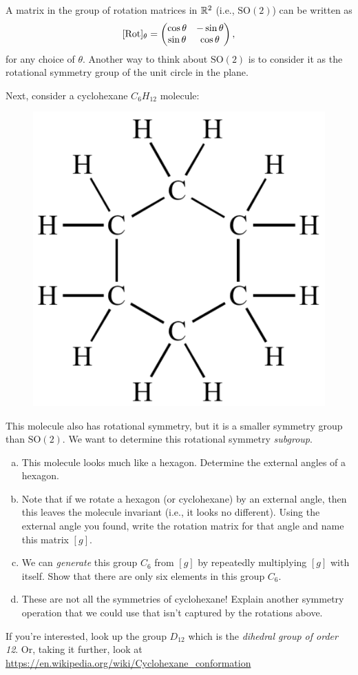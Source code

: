\documentclass[12pt]{article} %
\begin{document}
\newpage
\begin{problem}
A matrix in the group of rotation matrices in $\mathbb{R}^2$ (i.e., $\mathrm{SO}(2)$) can be written as
\[
[\mathrm{Rot}]_\theta = \begin{pmatrix} \cos \theta & - \sin \theta \\ \sin \theta & \cos \theta \end{pmatrix},
\]
for any choice of $\theta$. Another way to think about $\mathrm{SO}(2)$ is to consider it as the rotational symmetry group of the unit circle in the plane.

Next, consider a cyclohexane $C_6H_{12}$ molecule:
    \begin{figure}[H]
        \centering
        \includegraphics[width=.3\textwidth]{cyclohexane-500x500.png}
    \end{figure}
    \noindent This molecule also has rotational symmetry, but it is a smaller symmetry group than $\mathrm{SO}(2)$. We want to determine this rotational symmetry \emph{subgroup}.
\begin{enumerate}[(a)]
    \item This molecule looks much like a hexagon. Determine the external angles of a hexagon.
    \item Note that if we rotate a hexagon (or cyclohexane) by an external angle, then this leaves the molecule invariant (i.e., it looks no different). Using the external angle you found, write the rotation matrix for that angle and name this matrix $[g]$.
    \item We can \emph{generate} this group $C_6$ from $[g]$ by repeatedly multiplying $[g]$ with itself.  Show that there are only six elements in this group $C_6$.
    \item These are not all the symmetries of cyclohexane! Explain another symmetry operation that we could use that isn't captured by the rotations above.
\end{enumerate}
If you're interested, look up the group $D_{12}$ which is the \emph{dihedral group of order 12}. Or, taking it further, look at \url{https://en.wikipedia.org/wiki/Cyclohexane_conformation}
\end{problem}
\end{document}
